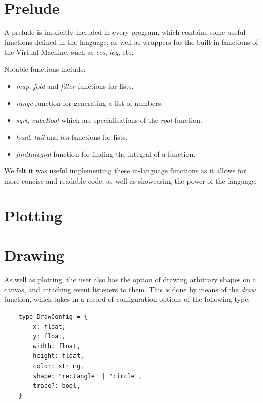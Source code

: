 


\section{Prelude}\label{sec:prelude}

A prelude is implicitly included in every program, which contains some useful functions defined in the language, as 
well as wrappers for the built-in functions of the Virtual Machine, such as \textit{cos}, \textit{log}, etc.

Notable functions include:

\begin{itemize}
    \item \textit{map}, \textit{fold} and \textit{filter} functions for lists.
    \item \textit{range} function for generating a list of numbers.
    \item \textit{sqrt}, \textit{cubeRoot} which are specialisations of the \textit{root} function.
    \item \textit{head}, \textit{tail} and \textit{len} functions for lists.
    \item \textit{findIntegral} function for finding the integral of a function.
\end{itemize}

We felt it was useful implementing these in-language functions as it allows for more concise and readable code, as
well as showcasing the power of the language.

\section{Plotting}\label{sec:plotting}


\section{Drawing}\label{sec:drawing}

As well as plotting, the user also has the option of drawing arbitrary shapes on a canvas, and attaching event 
listeners to them.
This is done by means of the \textit{draw} function, which takes in a record of configuration options of the following
type:

\begin{verbatim}
    type DrawConfig = {
        x: float,
        y: float,
        width: float,
        height: float,
        color: string,
        shape: "rectangle" | "circle",
        trace?: bool, 
    }
\end{verbatim}

